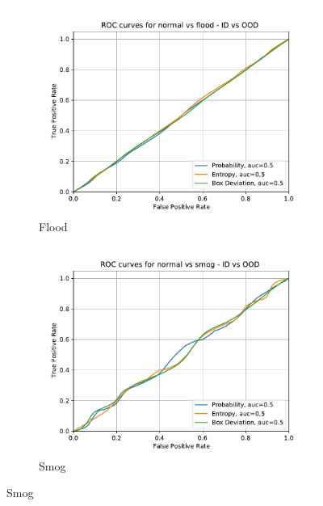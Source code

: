     \begin{figure}[ht]
    	\centering
    	\begin{subfigure}[t]{0.495\textwidth}
    		\centering
    		\includegraphics[width=\textwidth]{images/weather_roc/normal vs flood_ROC_Score_using_subens.pdf}
    		\caption{Flood}
    	\end{subfigure}
    	\begin{subfigure}[t]{0.495\textwidth}
    		\centering
    		\includegraphics[width=\textwidth]{images/weather_roc/normal vs smog_ROC_Score_using_subens.pdf}
    		\caption{Smog}
    	\end{subfigure}

\end{figure}
